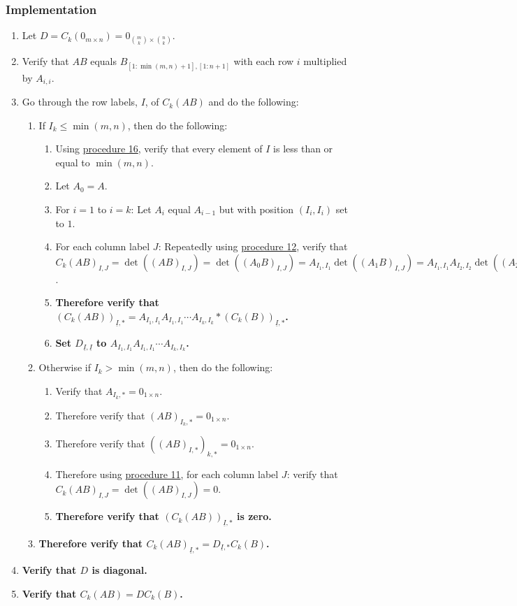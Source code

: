 \documentclass[twocolumn]{article}
\newcommand{\ul}[1]{\underline{#1}}
\begin{document}
			\subsubsection{Implementation}
				\begin{enumerate}
					\item Let $D=C_k(0_{m\times n})=0_{\binom{m}{k}\times\binom{n}{k}}$.
					\item Verify that $AB$ equals $B_{[1:\min(m,n)+1],[1:n+1]}$ with each row $i$ multiplied by $A_{i,i}$.
					\item Go through the row labels, $I$, of $C_k(AB)$ and do the following:
					\begin{enumerate}
						\item If $I_k\le \min(m,n)$, then do the following:
						\begin{enumerate}
							\item Using \hyperref[sec:procedure 16]{procedure 16}, verify that every element of $I$ is less than or equal to $\min(m,n)$.
							\item Let $A_0=A$.
							\item For $i=1$ to $i=k$: Let $A_i$ equal $A_{i-1}$ but with position $(I_i,I_i)$ set to $1$.
							\item For each column label $J$: Repeatedly using \hyperref[sec:procedure 12]{procedure 12}, verify that ${C_k(AB)}_{I,J}=\det((AB)_{I,J})=\det((A_0B)_{I,J})=A_{I_1,I_1}\det((A_1B)_{I,J})=A_{I_1,I_1}A_{I_2,I_2}\det((A_2B)_{I,J})=\cdots=A_{I_1,I_1}A_{I_2,I_2}\cdots A_{I_k,I_k}\det((A_kB)_{I,J})=A_{I_1,I_1}A_{I_2,I_2}\cdots A_{I_k,I_k}\det(B_{I,J})=A_{I_1,I_1}A_{I_2,I_2}\cdots A_{I_k,I_k}{C_k(B)}_{I,J}$.
							\item \textbf{Therefore verify that $(C_k(AB))_{\ul{I},*}=A_{I_1,I_1}A_{I_1,I_1}\cdots A_{I_k,I_k}*(C_k(B))_{\ul{I},*}$.}
							\item \textbf{Set $D_{\ul{I},\ul{I}}$ to $A_{I_1,I_1}A_{I_1,I_1}\cdots A_{I_k,I_k}$.}
						\end{enumerate}
						\item Otherwise if $I_k>\min(m,n)$, then do the following:
						\begin{enumerate}
							\item Verify that $A_{I_k,*}=0_{1\times n}$.
							\item Therefore verify that $(AB)_{I_k,*}=0_{1\times n}$.
							\item Therefore verify that $((AB)_{I,*})_{k,*}=0_{1\times n}$.
							\item Therefore using \hyperref[sec:procedure 11]{procedure 11}, for each column label $J$: verify that ${C_k(AB)}_{I,J}=\det((AB)_{I,J})=0$.
							\item \textbf{Therefore verify that $(C_k(AB))_{\ul{I},*}$ is zero.}
						\end{enumerate}
						\item \textbf{Therefore verify that ${C_k(AB)}_{\ul{I},*}=D_{\ul{I},*}C_k(B)$.}
					\end{enumerate}
					\item \textbf{Verify that $D$ is diagonal.}
					\item \textbf{Verify that $C_k(AB)=DC_k(B)$.}
				\end{enumerate}
\end{document}
